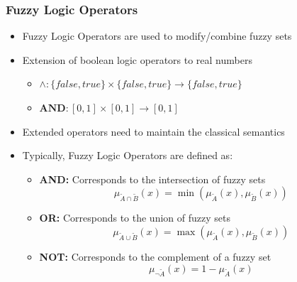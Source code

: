 \documentclass[
	10pt,
	t		%
]{beamer}
\begin{document}
\begin{frame}
	\frametitle{Fuzzy Logic Operators}
	\begin{itemize}
		\item Fuzzy Logic Operators are used to modify/combine fuzzy sets
		\item Extension of boolean logic operators to real numbers
		      \begin{itemize}
			      \item $\wedge : \{false, true\} \times \{false, true\} \rightarrow \{false, true\}$
			      \item $\textbf{AND} : [0,1] \times [0,1] \rightarrow [0,1]$
		      \end{itemize}
		\item Extended operators need to maintain the classical semantics
		\item Typically, Fuzzy Logic Operators are defined as:
		      \begin{itemize}
			      \item \textbf{AND:} Corresponds to the intersection of fuzzy sets
			            \[ \mu_{\tilde{A} \cap \tilde{B}}(x) = \min(\mu_{\tilde{A}}(x), \mu_{\tilde{B}}(x)) \]
			      \item \textbf{OR:} Corresponds to the union of fuzzy sets
			            \[ \mu_{\tilde{A} \cup \tilde{B}}(x) = \max(\mu_{\tilde{A}}(x), \mu_{\tilde{B}}(x)) \]
			      \item \textbf{NOT:} Corresponds to the complement of a fuzzy set
			            \[ \mu_{\neg \tilde{A}}(x) = 1 - \mu_{\tilde{A}}(x) \]

		      \end{itemize}
	\end{itemize}
\end{frame}
\end{document}
